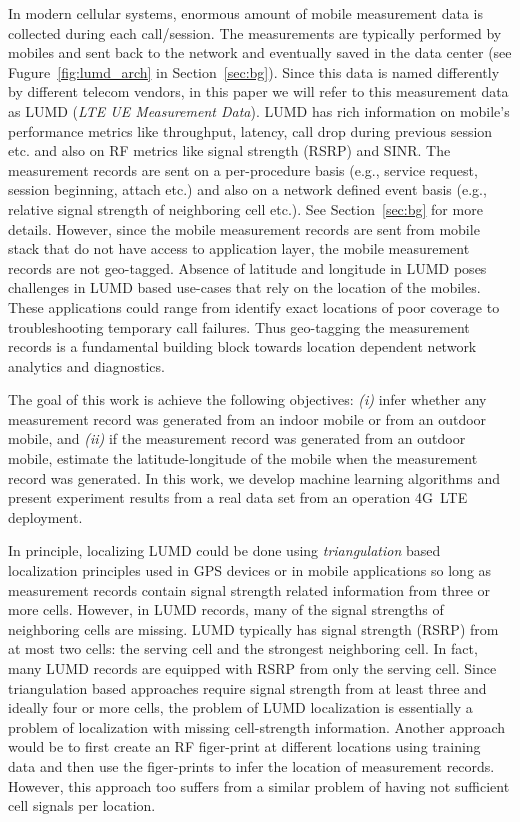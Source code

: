 \documentclass[conference, 10pt]{IEEEtran}
\begin{document}

In modern cellular systems, enormous amount of mobile measurement data is
collected during each call/session. The measurements are typically performed by
mobiles and sent back to the network and eventually saved in the data center (see
Fugure~\ref{fig:lumd_arch} in Section~\ref{sec:bg}). Since this
data is named differently by different telecom vendors, in this paper we will refer
to this measurement data as LUMD ({\em LTE UE Measurement Data}). LUMD has rich information
on mobile's performance metrics like throughput, latency, call drop during previous
session etc. and also on RF metrics like signal strength (RSRP) and SINR. The
measurement records are sent on a per-procedure basis (e.g., service request, session
beginning, attach etc.) and also on a network defined event basis (e.g., relative
signal strength of neighboring cell etc.). See Section~\ref{sec:bg} for more details.
However, since the mobile measurement records are sent from mobile stack that do not
have access to application layer, the mobile measurement records are not geo-tagged.
Absence of latitude and longitude in LUMD poses challenges in LUMD based use-cases
that rely on the location of the mobiles. These applications could range from
identify exact locations of poor coverage to troubleshooting temporary call failures.
Thus geo-tagging the measurement records is a fundamental building block towards
location dependent network analytics and diagnostics.



The goal of this work is achieve the following objectives: {\em (i)} infer whether
any measurement record was generated from an indoor mobile or from an outdoor mobile,
and {\em (ii)} if the measurement record was generated from an outdoor mobile,
estimate the latitude-longitude of the mobile when the measurement record was
generated. In this work, we develop machine learning algorithms
and present experiment results from a real data set from an operation
4G~LTE deployment.



In principle, localizing LUMD could be done using {\em triangulation} based
localization principles used in GPS devices or in mobile applications so long as
measurement records contain signal strength related information from three or more
cells. However, in
LUMD records, many of the signal strengths of neighboring cells are missing.  LUMD
typically has signal strength (RSRP) from at most two cells: the serving cell and the
strongest neighboring cell. In fact, many LUMD records are equipped with RSRP from
only the serving cell. Since triangulation based approaches require signal strength
from at least three and ideally four or more cells, the problem of LUMD localization
is essentially a problem of localization with missing cell-strength information.
Another approach would be to first create an RF figer-print at
different locations using training data and then use the figer-prints to infer
the location of measurement records. However, this approach too suffers from a
similar problem of having not sufficient cell signals per location.
\end{document}
